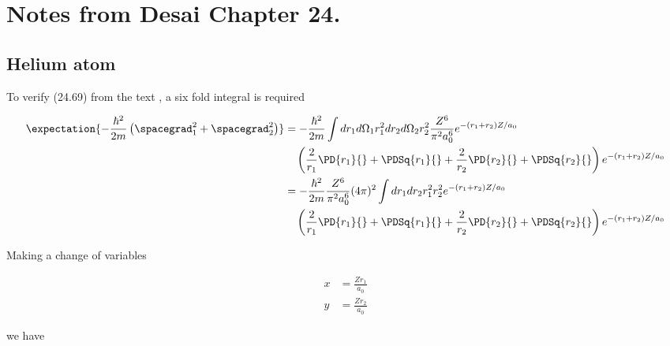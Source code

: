
%

\chapter{Notes from Desai Chapter 24.}
\label{chap:desaiCh24}
{}
\date{Sept 20, 2011}

\beginArtNoToc


\section{Helium atom}

To verify (24.69) from the text \cite{desai2009quantum}, a six fold integral is required

\begin{align*}
\expectation{
-\frac{\hbar^2}{2m}
\left( \spacegrad_1^2 + \spacegrad_2^2\right) 
}
&=
-\frac{\hbar^2}{2m}
\int 
dr_1 d \Omega_1 r_1^2 
dr_2 d \Omega_2 r_2^2 
\frac{ Z^6}{\pi^2 a_0^6 } 
e^{-(r_1 + r_2) Z/a_0}\\
&\quad \left(
\frac{2}{r_1} \PD{r_1}{}
+ \PDSq{r_1}{}
+\frac{2}{r_2} \PD{r_2}{}
+ \PDSq{r_2}{}
\right)
e^{-(r_1 + r_2) Z/a_0} \\
&=
-\frac{\hbar^2}{2m}
\frac{ Z^6}{\pi^2 a_0^6 } 
(4 \pi)^2
\int 
dr_1 
dr_2 
r_1^2 
r_2^2 
e^{-(r_1 + r_2) Z/a_0} \\
&\quad \left(
\frac{2}{r_1} \PD{r_1}{}
+ \PDSq{r_1}{}
+\frac{2}{r_2} \PD{r_2}{}
+ \PDSq{r_2}{}
\right)
e^{-(r_1 + r_2) Z/a_0} \\
\end{align*}

Making a change of variables 

\begin{align*}
x &= \frac{Z r_1 }{a_0} \\
y &= \frac{Z r_2 }{a_0}
\end{align*}

we have

